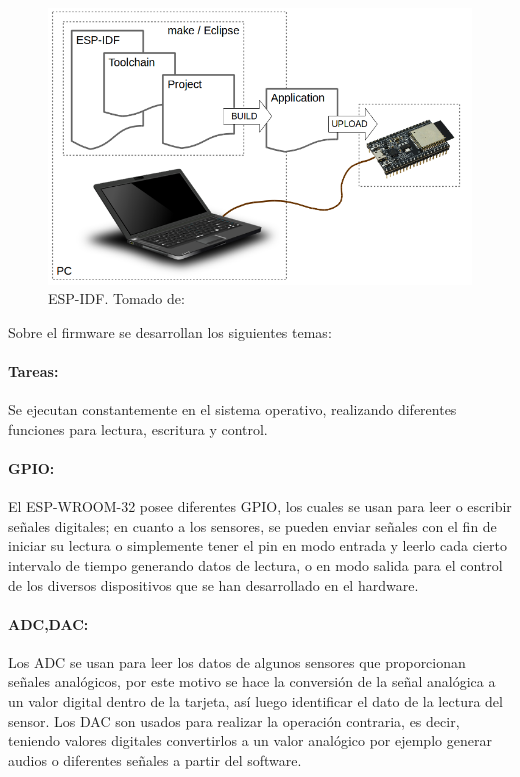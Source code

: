 \begin{figure}[H]
	\centering
	\caption{ESP-IDF. Tomado de: \cite{ES}}
	\label{fig:what-you-need}
	\includegraphics[width=0.5\linewidth]{Imagenes/what-you-need}
\end{figure}


Sobre el firmware se desarrollan los siguientes temas:

\paragraph{Tareas:}

Se ejecutan constantemente en el sistema operativo, realizando diferentes funciones para lectura, escritura y control.

\paragraph{GPIO:}

El ESP-WROOM-32 posee diferentes GPIO, los cuales se usan para leer o escribir señales digitales; en cuanto a los sensores, se pueden enviar señales con el fin de iniciar su lectura o simplemente tener el pin en modo entrada y leerlo cada cierto intervalo de tiempo generando datos de lectura, o en modo salida para el control de los diversos dispositivos que se han desarrollado en el hardware.

\paragraph{ADC,DAC:}

Los ADC se usan para leer los datos de algunos sensores que proporcionan señales analógicos, por este motivo se hace la conversión de la señal analógica a un valor digital dentro de la tarjeta, así luego identificar el dato de la lectura del sensor. Los DAC son usados para realizar la operación contraria, es decir, teniendo valores digitales convertirlos a un valor analógico por ejemplo generar audios o diferentes señales a partir del software.


